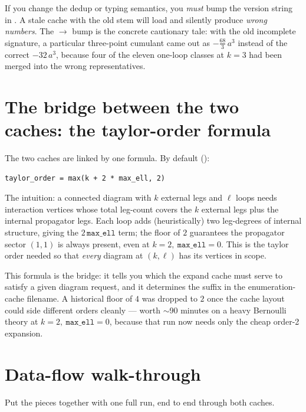 \begin{gotcha}
If you change the dedup or typing semantics, you \emph{must} bump the version
string in . A stale cache with the old stem will load and
silently produce \emph{wrong numbers}. The $\to$ bump is the
concrete cautionary tale: with the old incomplete signature, a particular
three-point cumulant came out as $-\tfrac{68}{3}\,a^3$ instead of the correct
$-32\,a^3$, because four of the eleven one-loop classes at $k=3$ had been merged
into the wrong representatives.
\end{gotcha}

\section{The bridge between the two caches: the taylor-order formula}

The two caches are linked by one formula. By default
():

\begin{lstlisting}
taylor_order = max(k + 2 * max_ell, 2)
\end{lstlisting}

The intuition: a connected diagram with $k$ external legs and $\ell$ loops needs
interaction vertices whose total leg-count covers the $k$ external legs plus the
internal propagator legs. Each loop adds (heuristically) two leg-degrees of
internal structure, giving the $2\,\texttt{max\_ell}$ term; the floor of $2$
guarantees the propagator sector $(1,1)$ is always present, even at
$k=2,\ \texttt{max\_ell}=0$. This is the taylor order needed so that
\emph{every} diagram at $(k,\ell)$ has its vertices in scope.

This formula is the bridge: it tells you which  the expand
cache must serve to satisfy a given diagram request, and it determines the
 suffix in the enumeration-cache filename. A historical floor
of $4$ was dropped to $2$ once the cache layout could side different orders
cleanly --- worth $\sim$90 minutes on a heavy Bernoulli theory at
$k=2,\ \texttt{max\_ell}=0$, because that run now needs only the cheap order-2
expansion.

\section{Data-flow walk-through}

Put the pieces together with one full
 run, end to end through
both caches.

